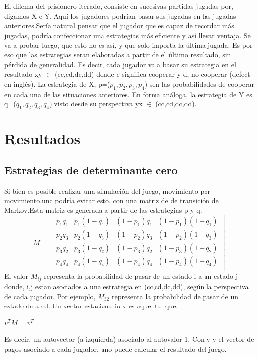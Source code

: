 \documentclass[12pt]{article}
\begin{document}
El dilema del prisionero iterado, consiste en sucesivas partidas jugadas por, digamos X e Y.
Aquí los jugadores podrían basar sus jugadas en las jugadas anteriores.Sería natural pensar que el jugador que es
capaz de recordar más jugadas, podría confeccionar una estrategias más eficiente y así llevar ventaja.
Se va a probar luego, que esto no es así, y que solo importa la última jugada. Es por eso que las estrategias seran elaboradas
a partir de el último resultado, sin pérdida de generalidad.
Es decir, cada jugador va a basar su estrategia en el resultado xy $\in$ (cc,cd,dc,dd) donde c significa cooperar y d, no cooperar 
(defect en inglés). La estrategia de X, p=($p_1,p_2,p_3,p_4$) son las probabilidades de cooperar en cada una de las situaciones 
anteriores. En forma análoga, la estrategia de Y es q=($q_1,q_2,q_3,q_4$) visto desde su perspectiva yx $\in$ (cc,cd,dc,dd).

\section{Resultados}
\subsection{Estrategias de determinante cero}
Si bien es posible realizar una simulación del juego, movimiento por movimiento,uno podría evitar esto, con una matriz de
de transición de Markov.Esta matriz es generada a partir de las estrategias p y q.
$$M=
\begin{bmatrix}
 p_1 q_1 &p_1(1-q_1) &(1-p_1)q_1 &(1-p_1)(1-q_1)\\
 p_2 q_3 &p_2(1-q_3) &(1-p_2)q_3 &(1-p_2)(1-q_3)\\
 p_3 q_2 &p_3(1-q_2) &(1-p_3)q_2 &(1-p_3)(1-q_2)\\
 p_4 q_4 &p_4(1-q_4) &(1-p_4)q_4 &(1-p_4)(1-q_4)\\
\end{bmatrix}
$$
El valor $M_{ij}$ representa la probabilidad de pasar de un estado i a un estado j donde, i,j estan asociados a una 
estrategia en (cc,cd,dc,dd), según la perspectiva de cada jugador.
Por ejemplo, $M_{32}$ representa la probabilidad de pasar de un estado dc a cd.
Un vector estacionario v es aquel tal que:
\begin{center}
$v^T M = v^T$
\end{center}
Es decir, un autovector (a izquierda) asociado al autovalor 1.
Con v y el vector de pagos asociado a cada jugador, uno puede calcular el resultado del juego.
\end{document}

